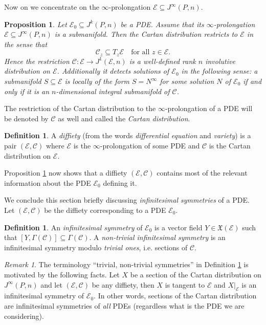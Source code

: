 \documentclass{conm-p-l}
\newtheorem{proposition}[theorem]{Proposition}
\theoremstyle{definition}
\newtheorem{definition}[theorem]{Definition}
\theoremstyle{remark}
\newtheorem{remark}[theorem]{Remark}
\numberwithin{equation}{section}
\begin{document}
Now on we concentrate on the $\infty$-prolongation $\mathscr E \subseteq J^\infty (P, n)$.

\begin{proposition}\label{prop:diffiety}
Let $\mathscr E_0 \subseteq J^k (P, n)$ be a PDE. Assume that its $\infty$-prolongation $\mathscr{E} \subseteq J^\infty (P, n)$ is a submanifold. Then the Cartan distribution restricts to $\mathscr E$ in the sense that
\[
\mathscr C_z \subseteq T_z \mathscr E \quad \text{for all $z \in \mathscr E$}.
\]
Hence the restriction $\mathscr C : \mathscr E \to J^1 (\mathscr E, n)$ is a well-defined rank $n$ involutive distribution on $\mathscr E$. Additionally it detects solutions of $\mathscr E_0$ in the following sense: a submanifold $S \subseteq \mathscr E$ is locally of the form $S = N^\infty$ for some solution $N$ of $\mathscr E_0$ if and only if it is an $n$-dimensional integral submanifold of $\mathscr C$. 
\end{proposition}

The restriction of the Cartan distribution to the $\infty$-prolongation of a PDE will be denoted by $\mathscr C$ as well and called the \emph{Cartan distribution}.

\begin{definition}
A \emph{diffiety} (from the words \emph{differential equation} and \emph{variety}) is a pair $(\mathscr E, \mathscr C)$ where $\mathscr E$ is the $\infty$-prolongation of some PDE and $\mathscr C$ is the Cartan distribution on $\mathscr E$.
\end{definition}

Proposition \ref{prop:diffiety} now shows that a diffiety $(\mathscr E, \mathscr C)$ contains most of the relevant information about the PDE $\mathscr E_0$ defining it.

We conclude this section briefly discussing \emph{infinitesimal symmetries} of a PDE. Let $(\mathscr E, \mathscr C)$ be the diffiety corresponding to a PDE $\mathscr E_0$.

\begin{definition}\label{def:inf_symm_E}
An \emph{infinitesimal symmetry} of $\mathscr E_0$ is a vector field $Y \in \mathfrak X (\mathscr E)$ such that $[Y, \Gamma (\mathscr C)] \subseteq \Gamma (\mathscr C)$. A \emph{non-trivial infinitesimal symmetry} is an infinitesimal symmetry modulo \emph{trivial ones}, i.e.{} sections of $\mathscr C$.
\end{definition}

\begin{remark}
The terminology ``trivial, non-trivial symmetries'' in Definition \ref{def:inf_symm_E} is motivated by the following facts. Let $X$ be a section of the Cartan distribution on $J^\infty (P, n)$ and let $(\mathscr E, \mathscr C)$ be any diffiety, then $X$ is tangent to $\mathscr E$ and $X|_{\mathscr E}$ is an infinitesimal symmetry of $\mathscr E_0$. In other words, sections of the Cartan distribution are infinitesimal symmetries of \emph{all} PDEs (regardless what is the PDE we are considering). 
\end{remark}
\end{document}
